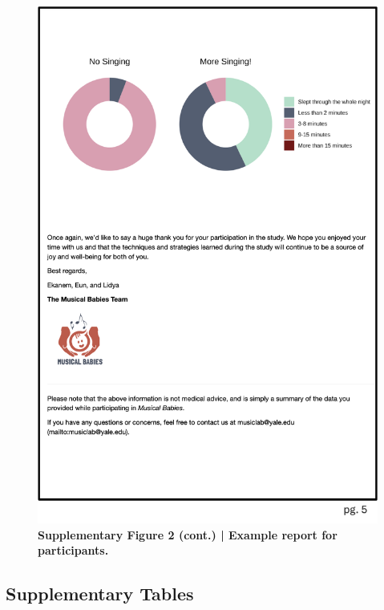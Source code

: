 \documentclass[
]{article}
\begin{document}
\begin{figure}[H]

{\centering \includegraphics[width=0.5\linewidth,]{../viz/s_figure2c} 

}

\caption{\textbf{Supplementary Figure 2 (cont.) | Example report for participants.}}\label{fig:supp fig 2c}
\end{figure}

\clearpage

\subsection*{Supplementary Tables}\label{supplementary-tables}
\end{document}
